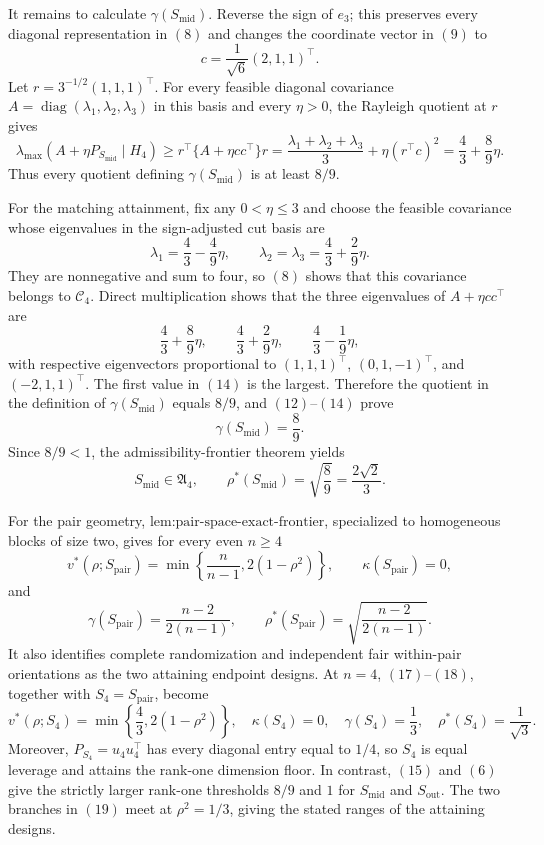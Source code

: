 It remains to calculate \(\gamma(S_{\mathrm{mid}})\). Reverse the sign of \(e_3\); this preserves every diagonal representation in \((8)\) and changes the coordinate vector in \((9)\) to
\[
c=\frac1{\sqrt6}(2,1,1)^\top.
\tag{11}
\]
Let \(r=3^{-1/2}(1,1,1)^\top\). For every feasible diagonal covariance \(A=\operatorname{diag}(\lambda_1,\lambda_2,\lambda_3)\) in this basis and every \(\eta>0\), the Rayleigh quotient at \(r\) gives
\[
\lambda_{\max}(A+\eta P_{S_{\mathrm{mid}}}\mid H_4)
\geq r^\top\{A+\eta cc^\top\}r
=\frac{\lambda_1+\lambda_2+\lambda_3}{3}
+\eta(r^\top c)^2
=\frac43+\frac89\eta.
\tag{12}
\]
Thus every quotient defining \(\gamma(S_{\mathrm{mid}})\) is at least \(8/9\).

For the matching attainment, fix any \(0<\eta\leq3\) and choose the feasible covariance whose eigenvalues in the sign-adjusted cut basis are
\[
\lambda_1=\frac43-\frac49\eta,
\qquad
\lambda_2=\lambda_3=\frac43+\frac29\eta.
\tag{13}
\]
They are nonnegative and sum to four, so \((8)\) shows that this covariance belongs to \(\mathcal C_4\). Direct multiplication shows that the three eigenvalues of \(A+\eta cc^\top\) are
\[
\frac43+\frac89\eta,
\qquad
\frac43+\frac29\eta,
\qquad
\frac43-\frac19\eta,
\tag{14}
\]
with respective eigenvectors proportional to \((1,1,1)^\top\), \((0,1,-1)^\top\), and \((-2,1,1)^\top\). The first value in \((14)\) is the largest. Therefore the quotient in the definition of \(\gamma(S_{\mathrm{mid}})\) equals \(8/9\), and \((12)\)--\((14)\) prove
\[
\gamma(S_{\mathrm{mid}})=\frac89.
\tag{15}
\]
Since \(8/9<1\), the admissibility-frontier theorem yields
\[
S_{\mathrm{mid}}\in\mathfrak A_4,
\qquad
\rho^*(S_{\mathrm{mid}})=\sqrt{\frac89}=\frac{2\sqrt2}{3}.
\tag{16}
\]

For the pair geometry, \(\text{lem:pair-space-exact-frontier}\), specialized to homogeneous blocks of size two, gives for every even \(n\geq4\)
\[
v^*(\rho;S_{\mathrm{pair}})
=\min\left\{\frac{n}{n-1},2(1-\rho^2)\right\},
\qquad
\kappa(S_{\mathrm{pair}})=0,
\tag{17}
\]
and
\[
\gamma(S_{\mathrm{pair}})=\frac{n-2}{2(n-1)},
\qquad
\rho^*(S_{\mathrm{pair}})=\sqrt{\frac{n-2}{2(n-1)}}.
\tag{18}
\]
It also identifies complete randomization and independent fair within-pair orientations as the two attaining endpoint designs. At \(n=4\), \((17)\)--\((18)\), together with \(S_4=S_{\mathrm{pair}}\), become
\[
v^*(\rho;S_4)=\min\left\{\frac43,2(1-\rho^2)\right\},
\quad
\kappa(S_4)=0,
\quad
\gamma(S_4)=\frac13,
\quad
\rho^*(S_4)=\frac1{\sqrt3}.
\tag{19}
\]
Moreover, \(P_{S_4}=u_4u_4^\top\) has every diagonal entry equal to \(1/4\), so \(S_4\) is equal leverage and attains the rank-one dimension floor. In contrast, \((15)\) and \((6)\) give the strictly larger rank-one thresholds \(8/9\) and \(1\) for \(S_{\mathrm{mid}}\) and \(S_{\mathrm{out}}\). The two branches in \((19)\) meet at \(\rho^2=1/3\), giving the stated ranges of the attaining designs.

